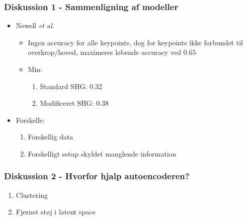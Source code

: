 \documentclass{beamer}
\begin{document}
\begin{frame}
    \frametitle{Diskussion 1 - Sammenligning af modeller}
    \begin{itemize}
        \item<1-> Newell \textit{et al.}
        \begin{itemize}
            \item Ingen accuracy for alle keypoints, dog for keypoints ikke forbundet til overkrop/hoved, maximeres løbende accuracy ved $0.65$
            \item<1-> Min:
            \begin{enumerate}
                \item Standard SHG: 0.32
                \item Modificeret SHG: 0.38
            \end{enumerate}
        \end{itemize}
        \item<1-> Forskelle:
        \begin{enumerate}
            \item Forskellig data
            \item Forskelligt setup skyldet manglende information
        \end{enumerate}
    \end{itemize}
\end{frame}

\begin{frame}
    \frametitle{Diskussion 2 - Hvorfor hjalp autoencoderen?}
    \begin{enumerate}
        \item<1-> Clustering
        \item<2> Fjernet støj i latent space
    \end{enumerate}
\end{frame}
\end{document}
